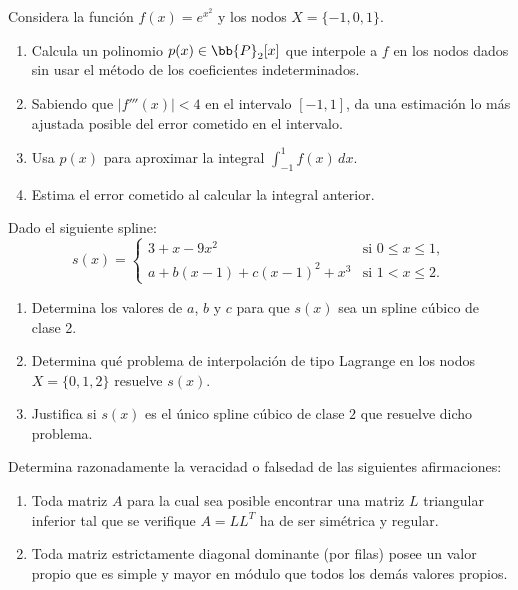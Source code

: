 \documentclass[12pt]{article}
\begin{document}
	\begin{ejercicio}
		Considera la función $f(x) = e^{x^2}$ y los nodos $X = \{-1, 0, 1\}$.
		
		\begin{enumerate}[label=\alph*)]
			\item Calcula un polinomio $p(x) \in \bb{P}_2[x]$ que interpole a $f$ en los nodos dados sin usar el método de los coeficientes indeterminados.
			
			\item Sabiendo que $|f'''(x)| < 4$ en el intervalo $[-1, 1]$, da una estimación lo más ajustada posible del error cometido en el intervalo.
			
			\item Usa $p(x)$ para aproximar la integral $\displaystyle \int_{-1}^{1} f(x) \, dx.$
			
			\item Estima el error cometido al calcular la integral anterior.
		\end{enumerate}
	\end{ejercicio}
	
	\begin{ejercicio}
		Dado el siguiente spline:
		$$ s(x)=
		\begin{cases}
			3+x-9x^2 & \text{si } 0 \leq x \leq 1, \\
			a + b(x - 1) + c(x - 1)^2 + x^3 & \text{si } 1 < x \leq 2.
		\end{cases}$$
		
		\begin{enumerate}[label=\alph*)]
			\item Determina los valores de $a$, $b$ y $c$ para que $s(x)$ sea un spline cúbico de clase 2.
			
			\item Determina qué problema de interpolación de tipo Lagrange en los nodos $X = \{0, 1, 2\}$ resuelve $s(x)$.
			
			\item Justifica si $s(x)$ es el único spline cúbico de clase $2$ que resuelve dicho problema.
		\end{enumerate}
	\end{ejercicio}
	
	\begin{ejercicio}
		Determina razonadamente la veracidad o falsedad de las siguientes afirmaciones:
		\begin{enumerate}[label=\alph*)]
			\item Toda matriz $A$ para la cual sea posible encontrar una matriz $L$ triangular inferior tal que se verifique $A = LL^T$ ha de ser simétrica y regular.
			
			\item Toda matriz estrictamente diagonal dominante (por filas) posee un valor propio que es simple y 
			mayor en módulo que todos los demás valores propios.
		\end{enumerate}
	\end{ejercicio}
	
\end{document}

